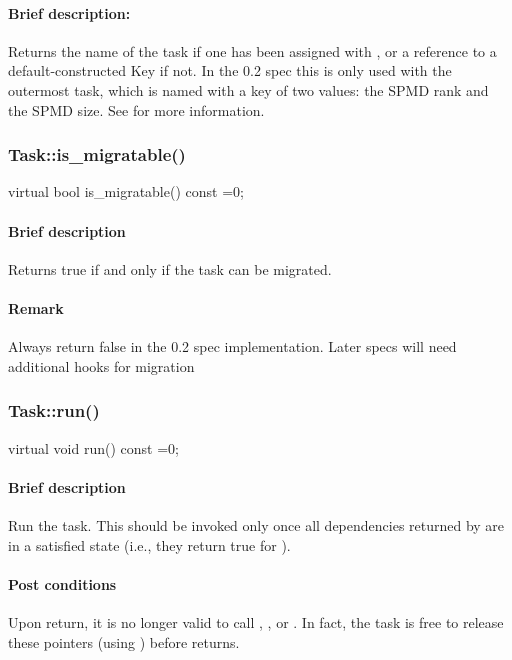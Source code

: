 \paragraph{Brief description:} Returns the name of the task if one has been assigned with , or
       a reference to a default-constructed Key if not.
       In the 0.2 spec this is only used with the outermost task, which is named with
       a key of two  values: the SPMD rank and the SPMD size.  See 
       for more information.


\subsubsection{Task::is\_migratable()}
\begin{CppCode}
    virtual bool
    is_migratable() const =0;
\end{CppCode}

\paragraph{Brief description} Returns true if and only if the task can be migrated.
     
\paragraph{Remark} Always return false in the 0.2 spec implementation.  Later specs will need
       additional hooks for migration



\subsubsection{Task::run()}
\begin{CppCode}
    virtual void
    run() const =0;
\end{CppCode}

\paragraph{Brief description} Run the task.
       This should be invoked only once all dependencies returned by 
       are in a satisfied state (i.e., they return true for ).
     
\paragraph{Post conditions} Upon return, it is no longer valid to call , ,
       or .  In fact, the task is free to release these pointers (using
       ) before  returns.
     
